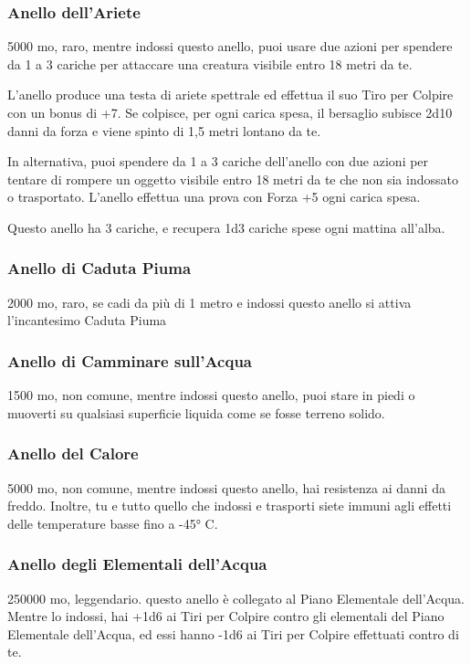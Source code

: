 \begin{multicols}{2}
\subsubsection*{Anello dell'Ariete}
5000 mo, raro, mentre indossi questo anello, puoi usare due azioni per spendere da 1 a 3 cariche per attaccare una creatura visibile entro 18 metri da te.

L'anello produce una testa di ariete spettrale ed effettua il suo Tiro per Colpire con un bonus di +7. Se colpisce, per ogni carica spesa, il bersaglio subisce 2d10 danni da forza e viene spinto di 1,5 metri lontano da te.

In alternativa, puoi spendere da 1 a 3 cariche dell'anello con due azioni per tentare di rompere un oggetto visibile entro 18 metri da te che non sia indossato o trasportato. L'anello effettua una prova con Forza +5 ogni carica spesa.

Questo anello ha 3 cariche, e recupera 1d3 cariche spese ogni mattina all'alba.

\subsubsection*{Anello di Caduta Piuma}
2000 mo, raro, se cadi da più di 1 metro e indossi questo anello si attiva l'incantesimo Caduta Piuma

\subsubsection*{Anello di Camminare sull'Acqua}
1500 mo, non comune, mentre indossi questo anello, puoi stare in piedi o muoverti su qualsiasi superficie liquida come se fosse terreno solido.

\subsubsection*{Anello del Calore}
5000 mo, non comune, mentre indossi questo anello, hai resistenza ai danni da freddo. Inoltre, tu e tutto quello che indossi e trasporti siete immuni agli effetti delle temperature basse fino a -45° C.

\subsubsection*{Anello degli Elementali dell'Acqua}
250000 mo, leggendario. questo anello è collegato al Piano Elementale dell'Acqua. Mentre lo indossi, hai +1d6 ai Tiri per Colpire contro gli elementali del Piano Elementale dell'Acqua, ed essi hanno -1d6 ai Tiri per Colpire effettuati contro di te.


\end{multicols}
